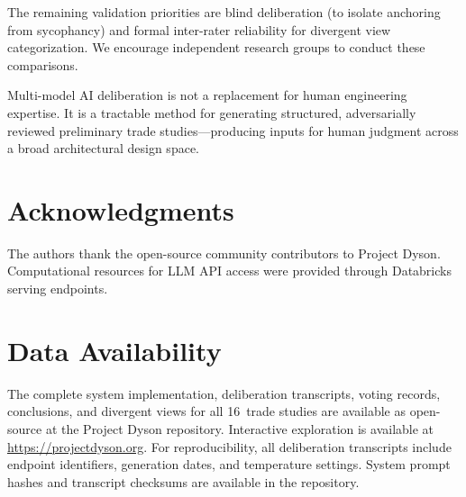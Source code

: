 \documentclass[11pt,a4paper]{article}
\begin{document}
The remaining validation priorities are blind deliberation (to isolate anchoring from sycophancy) and formal inter-rater reliability for divergent view categorization. We encourage independent research groups to conduct these comparisons.

Multi-model AI deliberation is not a replacement for human engineering expertise. It is a tractable method for generating structured, adversarially reviewed preliminary trade studies---producing inputs for human judgment across a broad architectural design space.

\section*{Acknowledgments}

The authors thank the open-source community contributors to Project Dyson. Computational resources for LLM API access were provided through Databricks serving endpoints.

\section*{Data Availability}

The complete system implementation, deliberation transcripts, voting records, conclusions, and divergent views for all 16~trade studies are available as open-source at the Project Dyson repository. Interactive exploration is available at \url{https://projectdyson.org}. For reproducibility, all deliberation transcripts include endpoint identifiers, generation dates, and temperature settings. System prompt hashes and transcript checksums are available in the repository.
\end{document}
